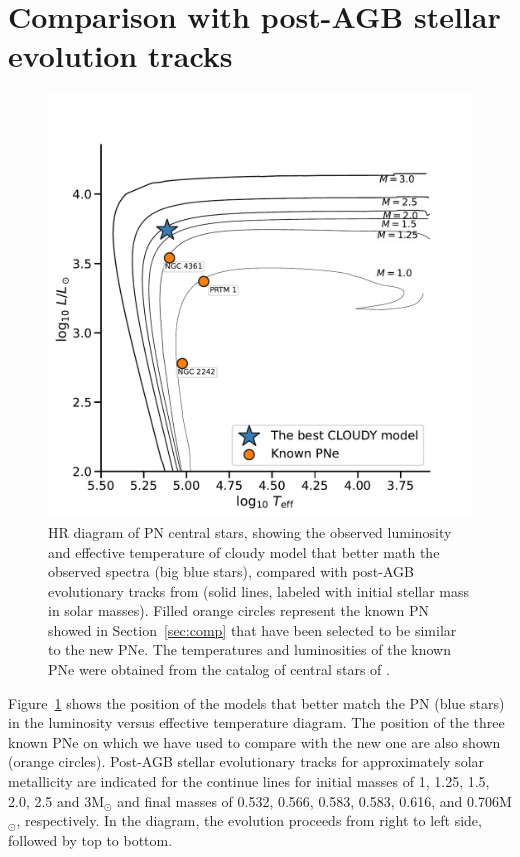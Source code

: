 \documentclass[fleqn,usenatbib]{mnras}
\begin{document}
\section{Comparison with post-AGB stellar evolution tracks}
\label{sec:tracks}

\begin{figure}
\centering
  \includegraphics[width=\linewidth]{Figs/hr-planetarieNebula}
  \caption{HR diagram of PN central stars, showing the observed luminosity
    and effective temperature of {\sc cloudy} model that better math the observed spectra
    (big blue stars), compared with post-AGB evolutionary tracks from \citet{Miller:2016}
    (solid lines, labeled with initial stellar mass in solar masses). Filled orange circles
    represent the known PN showed in Section~\ref{sec:comp} that have been selected to
    be similar to the new PNe. The temperatures and luminosities of the known
    PNe were obtained from the catalog of central stars of \citet{Weidmann:2020}.} 
 \label{fig:track-evolutive}
\end{figure}

Figure~\ref{fig:track-evolutive} shows the position of the models that better match the PN
(blue stars) in the luminosity versus effective temperature diagram.
The position of the three known PNe on which we have used to compare with the new
one are also shown (orange circles). Post-AGB stellar evolutionary tracks
for approximately solar metallicity \citep{Miller:2016} are indicated for the continue
lines for initial masses of 1, 1.25, 1.5, 2.0, 2.5 and 3M$_{\odot}$ and final masses of
0.532, 0.566, 0.583, 0.583, 0.616, and 0.706M$_{\odot}$, respectively. In the diagram,
the evolution proceeds from right to left side, followed by top to bottom.
\end{document}
